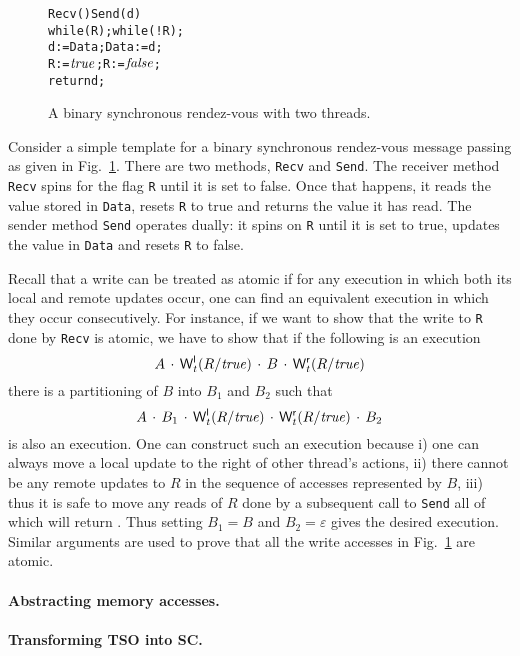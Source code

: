 \documentclass[preprint,9pt]{sigplanconf}
\begin{document}
\begin{figure}[t]
\begin{alltt}
Recv()          Send(d)
 while (R);      while (!R);
 d := Data;      Data := d;
 R := \(\alitrue\);       R := \(\alifalse\);
 return d;\end{alltt}
\caption{A binary synchronous rendez-vous with two threads.}
\label{fig:rendez-vous}
\end{figure}
Consider a simple template for a binary synchronous rendez-vous message passing as given in Fig.~\ref{fig:rendez-vous}.
There are two methods, {\tt Recv} and {\tt Send}.
The receiver method {\tt Recv} spins for the flag {\tt R} until it is set to false.
Once that happens, it reads the value stored in {\tt Data}, resets {\tt R} to true and returns the value it has read.
The sender method {\tt Send} operates dually: it spins on {\tt R} until it is set to true, updates the value in {\tt Data} and resets {\tt R} to false.

Recall that a write can be treated as atomic if for any execution in which both its local and remote updates occur, one can find an equivalent execution in which they occur consecutively. 
For instance, if we want to show that the write to {\tt R} done by {\tt Recv} is atomic, we have to show that if the following is an execution
\[
A\,\cdot\,{\mathsf{W}^{\mathsf{l}}_{t}(R/\mathit{true})}\,\cdot\,B\,\cdot\,{\mathsf{W}^{\mathsf{r}}_{t}(R/\mathit{true})}
\]
there is a partitioning of $B$ into $B_1$ and $B_2$ such that
\[
A\,\cdot\,B_1\,\cdot\,{\mathsf{W}^{\mathsf{l}}_{t}(R/\mathit{true})}\,\cdot\,{\mathsf{W}^{\mathsf{r}}_{t}(R/\mathit{true})}\,\cdot\,B_2
\]
is also an execution.
One can construct such an execution because i) one can always move a local update to the right of other thread's actions, ii) there cannot be any remote updates to $R$ in the sequence of accesses represented by $B$, iii) thus it is safe to move any reads of $R$ done by a subsequent call to {\tt Send} all of which will return {\alitrue}.
Thus setting $B_1=B$ and $B_2=\varepsilon$ gives the desired execution.
Similar arguments are used to prove that all the write accesses in Fig.~\ref{fig:rendez-vous} are atomic.

\paragraph{Abstracting memory accesses.}

\paragraph{Transforming TSO into SC.}
\end{document}
